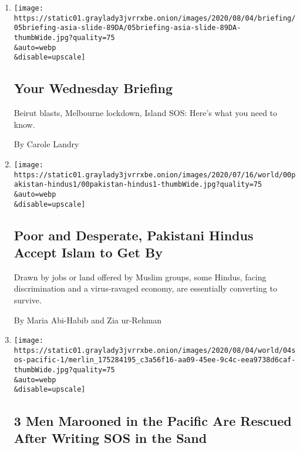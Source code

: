 \begin{enumerate}
\def\labelenumi{\arabic{enumi}.}
\item
  \href{/2020/08/04/briefing/beirut-explosion-melbourne-lockdown-pakistan.html}{}

  \texttt{[image: https://static01.graylady3jvrrxbe.onion/images/2020/08/04/briefing/05briefing-asia-slide-89DA/05briefing-asia-slide-89DA-thumbWide.jpg?quality=75\\\&auto=webp\\\&disable=upscale]}

  \hypertarget{your-wednesday-briefing}{%
  \subsection{Your Wednesday Briefing}\label{your-wednesday-briefing}}

  Beirut blasts, Melbourne lockdown, Island SOS: Here's what you need to
  know.

  By Carole Landry
\item
  \href{/2020/08/04/world/asia/pakistan-hindu-conversion.html}{}

  \texttt{[image: https://static01.graylady3jvrrxbe.onion/images/2020/07/16/world/00pakistan-hindus1/00pakistan-hindus1-thumbWide.jpg?quality=75\\\&auto=webp\\\&disable=upscale]}

  \hypertarget{poor-and-desperate-pakistani-hindus-accept-islam-to-get-by}{%
  \subsection{Poor and Desperate, Pakistani Hindus Accept Islam to Get
  By}\label{poor-and-desperate-pakistani-hindus-accept-islam-to-get-by}}

  Drawn by jobs or land offered by Muslim groups, some Hindus, facing
  discrimination and a virus-ravaged economy, are essentially converting
  to survive.

  By Maria Abi-Habib and Zia ur-Rehman
\item
  \href{/2020/08/04/world/australia/sos-pacific-island.html}{}

  \texttt{[image: https://static01.graylady3jvrrxbe.onion/images/2020/08/04/world/04sos-pacific-1/merlin\_175284195\_c3a56f16-aa09-45ee-9c4c-eea9738d6caf-thumbWide.jpg?quality=75\\\&auto=webp\\\&disable=upscale]}

  \hypertarget{3-men-marooned-in-the-pacific-are-rescued-after-writing-sos-in-the-sand}{%
  \subsection{3 Men Marooned in the Pacific Are Rescued After Writing
  SOS in the
  Sand}\label{3-men-marooned-in-the-pacific-are-rescued-after-writing-sos-in-the-sand}}


\end{enumerate}

